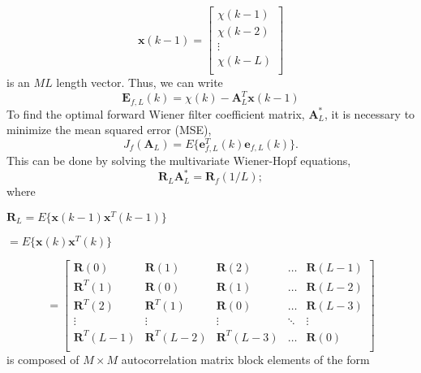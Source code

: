 \documentclass{article}
\begin{document}
\[
  \textbf{x}(k-1) = \begin{bmatrix}
    \chi(k-1)\\
    \chi(k-2)\\
    \vdots\\
    \chi(k-L)\\
  \end{bmatrix}
\]
is an $ML$ length vector. Thus, we can write\\
\begin{equation}
  \textbf{E}_{f,L}(k) = \chi(k) - \textbf{A}^{T}_{L}\textbf{x}(k-1)
\end{equation}
To find the optimal forward Wiener filter coefficient matrix, $\textbf{A}^{*}_{L}$, it is necessary to minimize the mean squared error (MSE),\\
\begin{equation}
  J_{f}(\textbf{A}_{L}) = E\big\{\textbf{e}^{T}_{f,L}(k)\textbf{e}_{f,L}(k)\big\}.
\end{equation}
This can be done by solving the multivariate Wiener-Hopf equations,\\
\begin{equation}
  \textbf{R}_{L}\textbf{A}^{*}_{L}=\textbf{R}_{f}(1/L);
\end{equation}
where\\
\begin{center}
  $\textbf{R}_{L} = E\big\{\textbf{x}(k-1)\textbf{x}^{T}(k-1)\big\}$
\end{center}
\begin{center}
  $= E\big\{\textbf{x}(k)\textbf{x}^{T}(k)\big\}$
\end{center}
\begin{equation}
  =\begin{bmatrix}
    \textbf{R}(0) & \textbf{R}(1) & \textbf{R}(2) & \dots & \textbf{R}(L-1)\\
    \textbf{R}^{T}(1) & \textbf{R}(0) & \textbf{R}(1) & \dots & \textbf{R}(L-2)\\
    \textbf{R}^{T}(2) & \textbf{R}^{T}(1) & \textbf{R}(0) & \dots & \textbf{R}(L-3)\\
    \vdots & \vdots & \vdots & \ddots & \vdots \\
    \textbf{R}^{T}(L-1) & \textbf{R}^{T}(L-2) & \textbf{R}^{T}(L-3) & \dots & \textbf{R}(0)\\
  \end{bmatrix}
\end{equation}
is composed of $M \times M$ autocorrelation matrix block elements of the form\\
\end{document}
